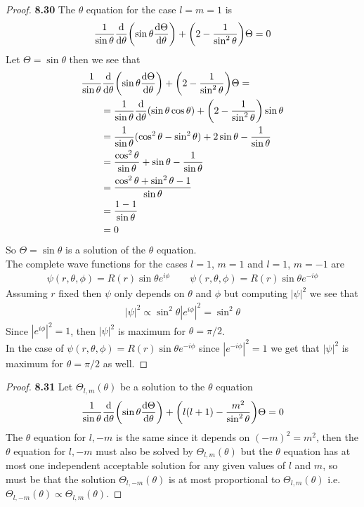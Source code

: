 \documentclass[11pt]{article}
\theoremstyle{definition}
\begin{document}
\cleardoublepage
\begin{proof}{\textbf{8.30}}
The $\theta$ equation for the case $l = m = 1$ is
\begin{align*}
    \frac{1}{\sin\theta}\dv{\theta}(\sin\theta \dv{\Theta}{\theta})
    + \bigg(2 - \frac{1}{\sin^2\theta}\bigg)\Theta = 0
\end{align*}
Let $\Theta = \sin\theta$ then we see that
\begin{align*}
    &\frac{1}{\sin\theta}\dv{\theta}(\sin\theta \dv{\Theta}{\theta})
    + \bigg(2 - \frac{1}{\sin^2\theta}\bigg)\Theta =\\
    &\qquad=\frac{1}{\sin\theta}\dv{\theta}(\sin\theta \cos\theta)
    + \bigg(2 - \frac{1}{\sin^2\theta}\bigg)\sin\theta\\
    &\qquad=\frac{1}{\sin\theta}(\cos^2\theta - \sin^2\theta)
    + 2\sin\theta - \frac{1}{\sin\theta}\\
    &\qquad=\frac{\cos^2\theta}{\sin\theta}
    + \sin\theta - \frac{1}{\sin\theta}\\
    &\qquad=\frac{\cos^2\theta + \sin^2\theta - 1}{\sin\theta}\\
    &\qquad=\frac{1 - 1}{\sin\theta}\\
    &\qquad=0
\end{align*}
So $\Theta = \sin\theta$ is a solution of the $\theta$ equation.
\\
The complete wave functions for the cases $l = 1$, $m = 1$ and $l = 1$, $m = -1$
are 
\begin{align*}
    \psi(r, \theta, \phi) = R(r)\sin\theta e^{i\phi}
    \qquad
    \psi(r, \theta, \phi) = R(r)\sin\theta e^{-i\phi}
\end{align*}
Assuming $r$ fixed then $\psi$ only depends on $\theta$ and $\phi$ but
computing $|\psi|^2$ we see that
\begin{align*}
    |\psi|^2 \propto \sin^2\theta |e^{i\phi}|^2 = \sin^2\theta
\end{align*}
Since $|e^{i\phi}|^2 = 1$, then $|\psi|^2$ is maximum for $\theta = \pi/2$.
\\
In the case of $\psi(r, \theta, \phi) = R(r)\sin\theta e^{-i\phi}$ since
$|e^{-i\phi}|^2 = 1$ we get that $|\psi|^2$ is maximum for $\theta = \pi/2$
as well.


\end{proof}

\cleardoublepage
\begin{proof}{\textbf{8.31}}
Let $\Theta_{l,m}(\theta)$ be a solution to the $\theta$ equation
\begin{align*}
    \frac{1}{\sin\theta}\dv{\theta}(\sin\theta \dv{\Theta}{\theta})
    + \bigg(l(l + 1) - \frac{m^2}{\sin^2\theta}\bigg)\Theta = 0
\end{align*}
The $\theta$ equation for $l, -m$ is the same since it depends on
$(-m)^2 = m^2$, then the $\theta$ equation for $l, -m$ must
also be solved by $\Theta_{l,m}(\theta)$ but the $\theta$ equation has at most
one independent acceptable solution for any given values of $l$ and $m$, so
must be that the solution $\Theta_{l, -m}(\theta)$ is at most proportional to
$\Theta_{l, m}(\theta)$ i.e. $\Theta_{l, -m}(\theta) \propto \Theta_{l, m}(\theta)$.
\end{proof}
\end{document}
